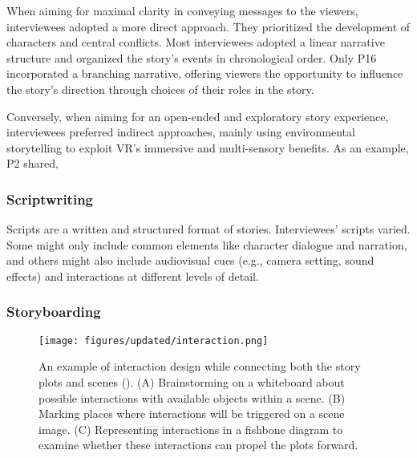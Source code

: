 When aiming for maximal clarity in conveying messages to the viewers, interviewees adopted a more direct approach. They prioritized the development of characters and central conflicts. Most interviewees adopted a linear narrative structure and organized the story's events in chronological order. Only P16 incorporated a branching narrative, offering viewers the opportunity to influence the story's direction through choices of their roles in the story.

Conversely, when aiming for an open-ended and exploratory story experience, interviewees preferred indirect approaches, mainly using environmental storytelling to exploit VR's immersive and multi-sensory benefits. As an example, P2 shared, 

\subsubsection{Scriptwriting}
\label{sec:script_writing}
Scripts are a written and structured format of stories. Interviewees' scripts varied. Some might only include common elements like character dialogue and narration, and others might also include audiovisual cues (e.g., camera setting, sound effects) and interactions at different levels of detail. 

\subsubsection{Storyboarding}
\label{sec:storyboarding}


\begin{figure*}[!tb]
    \centering
    \texttt{[image: figures/updated/interaction.png]}
    \caption{An example of interaction design while connecting both the story plots and scenes (). (A) Brainstorming on a whiteboard about possible interactions with available objects within a scene. (B) Marking places where interactions will be triggered on a scene image. (C) Representing interactions in a fishbone diagram to examine whether these interactions can propel the plots forward.}
    \label{fig:interaction_design_1}
\end{figure*}

